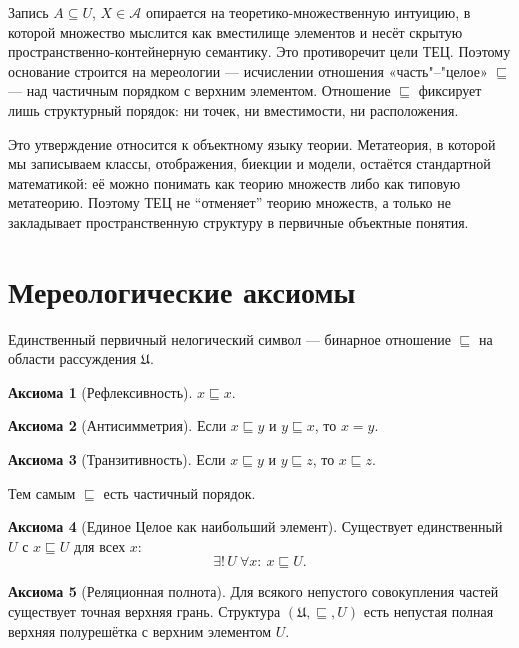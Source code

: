 \documentclass[12pt,a4paper,oneside]{book}
\theoremstyle{definition}
\newtheorem{axiom}{Аксиома}[chapter]
\theoremstyle{plain}
\theoremstyle{remark}
\newcommand{\Whole}{U}
\newcommand{\Parts}{\mathcal A}
\newcommand{\PartOf}{\sqsubseteq}
\begin{document}
Запись $A\subseteq\Whole$, $X\in\Parts$ опирается на теоретико-множественную
интуицию, в которой множество мыслится как вместилище элементов и несёт скрытую
пространственно-контейнерную семантику. Это противоречит цели ТЕЦ. Поэтому основание
строится на мереологии --- исчислении отношения «часть"--"целое» $\PartOf$ --- над
частичным порядком с верхним элементом. Отношение $\PartOf$ фиксирует лишь
структурный порядок: ни точек, ни вместимости, ни расположения.

Это утверждение относится к объектному языку теории. Метатеория, в которой мы
записываем классы, отображения, биекции и модели, остаётся стандартной математикой:
её можно понимать как теорию множеств либо как типовую метатеорию. Поэтому ТЕЦ не
``отменяет'' теорию множеств, а только не закладывает пространственную структуру в
первичные объектные понятия.

\section{Мереологические аксиомы}

Единственный первичный нелогический символ --- бинарное отношение $\PartOf$ на области
рассуждения $\mathfrak U$.

\begin{axiom}[Рефлексивность]
$x\PartOf x$.
\end{axiom}

\begin{axiom}[Антисимметрия]
Если $x\PartOf y$ и $y\PartOf x$, то $x=y$.
\end{axiom}

\begin{axiom}[Транзитивность]
Если $x\PartOf y$ и $y\PartOf z$, то $x\PartOf z$.
\end{axiom}

Тем самым $\PartOf$ есть частичный порядок.

\begin{axiom}[Единое Целое как наибольший элемент]
Существует единственный $\Whole$ с $x\PartOf\Whole$ для всех $x$:
\[
\exists!\,\Whole\ \forall x:\ x\PartOf\Whole.
\]
\end{axiom}

\begin{axiom}[Реляционная полнота]
Для всякого непустого совокупления частей существует точная верхняя грань. Структура
$(\mathfrak U,\PartOf,\Whole)$ есть непустая полная верхняя полурешётка с верхним
элементом $\Whole$.
\end{axiom}
\end{document}
